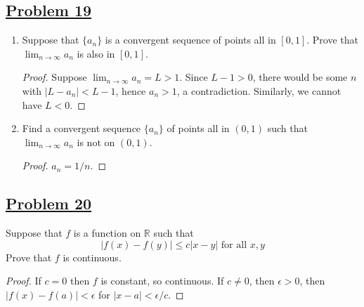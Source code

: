 \documentclass[10pt,letterpaper]{article}
\begin{document}
	\subsection*{{\color{purple}\underline{Problem 19}}}
	\begin{enumerate}
		\item Suppose that $\{a_n\}$ is a convergent sequence of points all in $[0, 1]$. Prove that
		$\displaystyle\lim_{n\to \infty} a_n$ is also in $[0, 1]$.
		\begin{proof}
			Suppose $\displaystyle\lim_{n\to \infty}a_n = L > 1$. Since $L - 1 > 0$, there would be some $n$
			with $|L - a_n| < L - 1$, hence $a_n > 1$, a contradiction. Similarly, we cannot have $L < 0$.
		\end{proof}
		
		\item Find a convergent sequence $\{a_n\}$ of points all in $(0, 1)$ such that 
		$\displaystyle\lim_{n\to \infty}a_n$ is not on $(0, 1)$.
		\begin{proof}
			$a_n = 1/n$.
		\end{proof}
	\end{enumerate}
	
	\subsection*{{\color{purple}\underline{Problem 20}}}
	Suppose that $f$ is a function on $\mathbb{R}$ such that
	$$|f(x) - f(y)| \leq c|x - y| \text{     for all } x, y$$
	Prove that $f$ is continuous.
	\begin{proof}
		If $c = 0$ then $f$ is constant, so continuous. If $c \neq 0$, then $\epsilon > 0$, then 
		$|f(x) - f(a)| < \epsilon$ for $|x - a| < \epsilon/c$.
	\end{proof}
\end{document}
